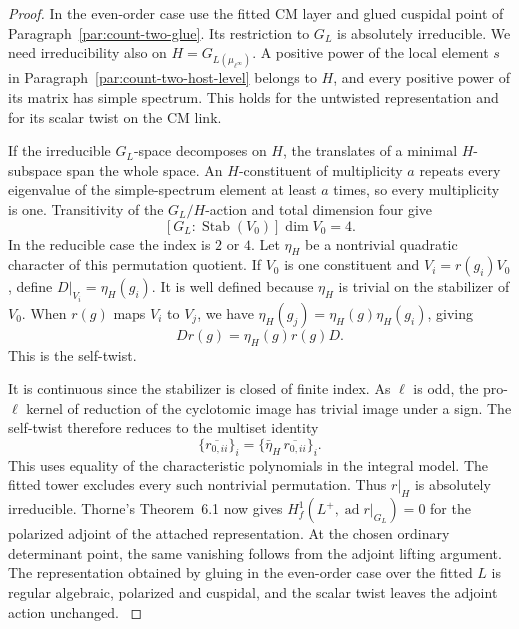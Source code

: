 \begin{proof}

In the even-order case use the fitted CM layer and glued cuspidal point
of Paragraph~\ref{par:count-two-glue}. Its restriction to
\(G_L\) is absolutely irreducible. We need irreducibility
also on \(H=G_{L(\mu_{\ell^\infty})}\). A positive power of
the local element \(s\) in Paragraph~\ref{par:count-two-host-level}
belongs to \(H\), and every positive power of its matrix has
simple spectrum. This holds for the untwisted representation
and for its scalar twist on the CM link.

If the irreducible \(G_L\)-space decomposes on \(H\), the
translates of a minimal \(H\)-subspace span the whole space.
An \(H\)-constituent of multiplicity \(a\) repeats every
eigenvalue of the simple-spectrum element at least \(a\) times,
so every multiplicity is one. Transitivity of the \(G_L/H\)-action
and total dimension four give
\[
         [G_L:\operatorname{Stab}(V_0)]\dim V_0=4.
\]
In the reducible case the index is \(2\) or \(4\). Let \(\eta_H\) be a nontrivial quadratic character of this
permutation quotient. If \(V_0\) is one constituent and
\(V_i=r(g_i)V_0\), define \(D|_{V_i}=\eta_H(g_i)\).
It is well defined because \(\eta_H\) is trivial on the
stabilizer of \(V_0\). When \(r(g)\) maps \(V_i\) to \(V_j\),
we have \(\eta_H(g_j)=\eta_H(g)\eta_H(g_i)\), giving
\[
                   D r(g)=\eta_H(g)r(g)D .
\]
This is the self-twist.

It is continuous since the stabilizer
is closed of finite index. As \(\ell\) is odd, the pro-\(\ell\) kernel of reduction of the
cyclotomic image has trivial image under a sign. The self-twist
therefore reduces to the multiset identity
\[
             \{\overline{r_{0,ii}}\}_i
                =\{\bar\eta_H\,\overline{r_{0,ii}}\}_i .
\]
This uses equality of the characteristic polynomials in the
integral model. The fitted tower excludes every
such nontrivial permutation. Thus \(r|_H\) is absolutely irreducible.
Thorne's Theorem~6.1 now gives
\(H^1_f(L^+,\operatorname{ad} r|_{G_L})=0\) for the
polarized adjoint of the attached representation.
At the chosen ordinary determinant point, the same vanishing follows from the adjoint lifting argument. The
representation obtained by gluing in the even-order case over the fitted \(L\) is
regular algebraic, polarized and cuspidal, and the scalar
twist leaves the adjoint action unchanged.
\hfill\mbox{\cite{thorne-adjoint}}\label{cor:ordinary-symplectic-cohomology-13}


\end{proof}
